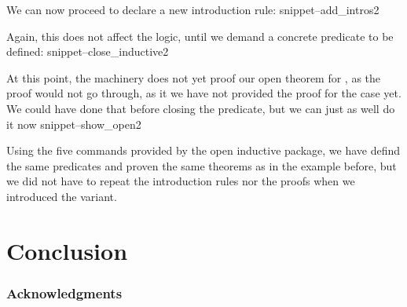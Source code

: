 \documentclass{llncs}
\newcommand{\Snippet}[1]{\csname snippet--#1\endcsname}
\begin{document}
We can now proceed to declare a new introduction rule:
\Snippet{add_intros2}

Again, this does not affect the logic, until we demand a concrete predicate to be defined:
\Snippet{close_inductive2}

At this point, the machinery does not yet proof our open theorem for  , as the proof would not go through, as it we have not provided the proof for the  case yet. We could have done that before closing the predicate, but we can just as well do it now
\Snippet{show_open2}

Using the five commands provided by the open inductive package, we have defind the same predicates and proven the same theorems as in the example before, but we did not have to repeat the introduction rules nor the proofs when we introduced the variant.








\section{Conclusion}

\subsubsection*{Acknowledgments}



\end{document}
